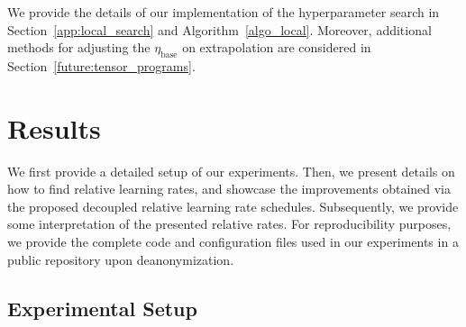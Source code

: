 \documentclass{article}
\theoremstyle{plain}
\theoremstyle{definition}
\theoremstyle{remark}
\newcommand{\jl}[1]{\textcolor{green}{[JL: #1]}}
\newcommand{\jmr}[2]{\textcolor{purple}{[JM:] \sout{#1} #2}}
\begin{document}
    
    
    We provide the details of our implementation of the hyperparameter search in Section~\ref{app:local_search} and Algorithm~\ref{algo_local}. Moreover, additional methods for adjusting the $\eta_{\text{base}}$ on extrapolation are considered in Section~\ref{future:tensor_programs}.
    
    
    
    \section{Results}
    
    
    We first provide a detailed setup of our experiments. Then, we present details on how to find relative learning rates, and showcase the improvements obtained via the proposed decoupled relative learning rate schedules. Subsequently, we provide some interpretation of the presented relative rates. For reproducibility purposes, we provide the complete code and configuration files used in our experiments in a public repository upon deanonymization. 
    
    \subsection{Experimental Setup}
    
\end{document}
